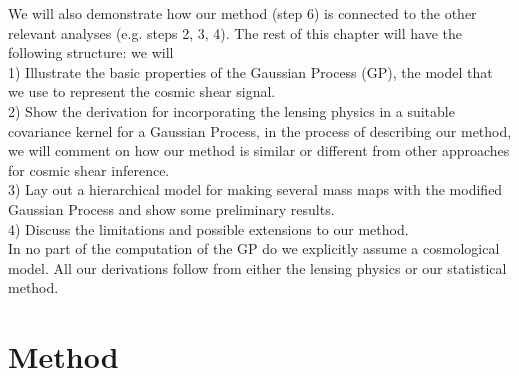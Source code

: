 We will also demonstrate how our method
(step 6) is connected to the other relevant analyses (e.g. steps 2, 3, 4). 
The rest of this chapter will have the following structure: we will \\ 
1) Illustrate the basic properties of the Gaussian Process (GP), the model that we
use to represent the cosmic shear signal.\\ 
2) Show the derivation for incorporating the lensing physics in 
a suitable covariance kernel for a Gaussian Process,  
in the process of describing our method, we will comment on how our method is  
similar or different from other approaches for cosmic shear inference.\\
3) Lay out a hierarchical model for making several mass maps 
with the modified Gaussian Process and show some preliminary results.\\ 
4) Discuss the limitations and possible extensions to our method.\\
In no part of the computation of the GP do we explicitly assume a cosmological model. All our
derivations follow from either the lensing physics or our statistical method.   


\section{Method}


